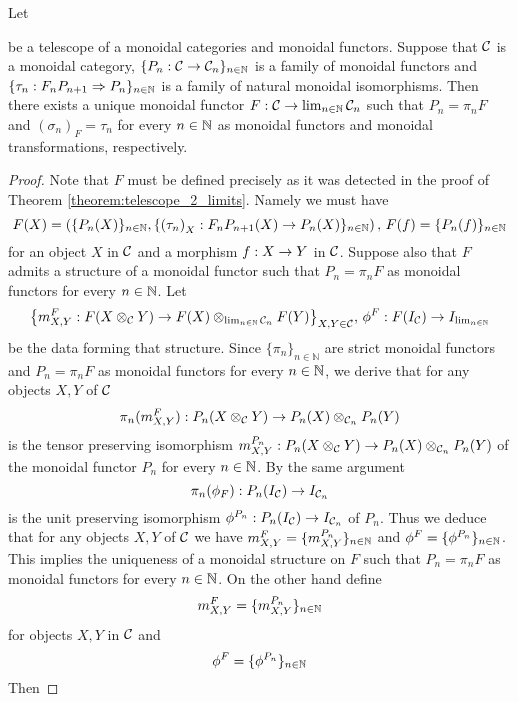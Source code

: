 \begin{theorem}\label{theorem:telescope_monoidal_2_limit}
Let 
\begin{center}   
\end{center}
be a telescope of a monoidal categories and monoidal functors. Suppose that ${\mathcal C}$ is a monoidal category, $\{P_n:{\mathcal C}\rightarrow {\mathcal C}_n\}_{n\in {\mathbb N}}$ is a family of monoidal functors and $\{\tau_n:F_nP_{n+1}\Rightarrow P_{n}\}_{n\in {\mathbb N}}$ is a family of natural monoidal isomorphisms. Then there exists a unique monoidal functor $F:{\mathcal C}\rightarrow \lim_{n\in {\mathbb N}}{\mathcal C}_n$ such that $P_n = \pi_nF$ and $\left(\sigma_n\right)_F = \tau_n$ for every $n\in {\mathbb N}$ as monoidal functors and monoidal transformations, respectively.
\end{theorem}
\begin{proof}
Note that $F$ must be defined precisely as it was detected in the proof of Theorem \ref{theorem:telescope_2_limits}. Namely we must have
$$F(X) = \left(\{P_n(X)\}_{n\in {\mathbb N}},\{\left(\tau_n\right)_X:F_nP_{n+1}(X)\rightarrow P_n(X)\}_{n\in {\mathbb N}}\right),\,F(f) = \{P_n(f)\}_{n\in {\mathbb N}}$$
for an object $X$ in ${\mathcal C}$ and a morphism $f:X\rightarrow Y$ in ${\mathcal C}$. Suppose also that $F$ admits a structure of a monoidal functor such that $P_n = \pi_nF$ as monoidal functors for every $n\in {\mathbb N}$. Let $$\big\{m^F_{X,Y}:F(X\otimes_{{\mathcal C}}Y)\rightarrow F(X)\otimes_{\lim_{n\in {\mathbb N}}{\mathcal C}_n}F(Y)\big\}_{X,Y\in {\mathcal C}},\,\phi^F:F(I_{{\mathcal C}})\rightarrow I_{\lim_{n\in {\mathbb N}}}$$
be the data forming that structure. Since $\{\pi_n\}_{n\in \mathbb{N}}$ are strict monoidal functors and $P_n = \pi_nF$ as monoidal functors for every $n\in {\mathbb N}$, we derive that for any objects $X,Y$ of ${\mathcal C}$
$$\pi_n(m^F_{X,Y}):P_n(X\otimes_{{\mathcal C}}Y) \rightarrow P_n(X)\otimes_{{\mathcal C}_n}P_n(Y)$$
is the tensor preserving isomorphism $m^{P_n}_{X,Y}:P_n(X\otimes_{{\mathcal C}}Y) \rightarrow P_n(X)\otimes_{{\mathcal C}_n}P_n(Y)$ of the monoidal functor $P_n$ for every $n\in {\mathbb N}$. By the same argument
$$\pi_n(\phi_F):P_n(I_{{\mathcal C}})\rightarrow I_{{\mathcal C}_n}$$
is the unit preserving isomorphism $\phi^{P_n}:P_n(I_{{\mathcal C}})\rightarrow I_{{\mathcal C}_n}$ of $P_n$. Thus we deduce that for any objects $X,Y$ of ${\mathcal C}$ we have $m^F_{X,Y} = \{m^{P_n}_{X,Y}\}_{n\in {\mathbb N}}$ and $\phi^F = \{\phi^{P_n}\}_{n\in {\mathbb N}}$. This implies the uniqueness of a monoidal structure on $F$ such that $P_n = \pi_nF$ as monoidal functors for every $n\in {\mathbb N}$. On the other hand define
$$m^F_{X,Y} = \{m^{P_n}_{X,Y}\}_{n\in {\mathbb N}}$$
for objects $X,Y$ in ${\mathcal C}$ and
$$\phi^F = \{\phi^{P_n}\}_{n\in {\mathbb N}}$$
Then 

\end{proof}














\small




